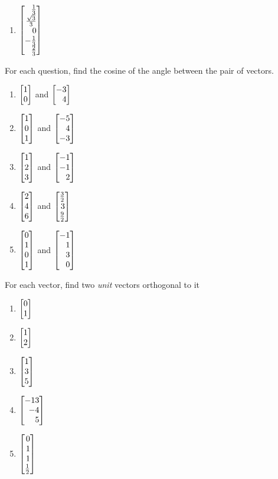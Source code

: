 \begin{exercises}
\begin{problist}
\begin{enumerate}
			\item $\mat{\frac{1}{3}\\\frac{\sqrt{3}}{3}\\0\\-\frac{1}{3}\\\frac{2}{3}}$
		\end{enumerate}
		\prob For each question, find the cosine of the angle between the pair of vectors.
		\begin{enumerate}
			\item $\mat{1\\0}$ and $\mat{-3\\4}$
			\item $\mat{1\\0\\1}$ and $\mat{-5\\4\\-3}$
			\item $\mat{1\\2\\3}$ and $\mat{-1\\-1\\2}$
			\item $\mat{2\\4\\6}$ and $\mat{\frac{3}{2}\\3\\\frac{9}{2}}$
			\item $\mat{0\\1\\0\\1}$ and $\mat{-1\\1\\3\\0}$
		\end{enumerate}
		\prob For each vector, find two \emph{unit} vectors orthogonal to it
		\begin{enumerate}
			\item $\mat{0\\1}$
			\item $\mat{1\\2}$
			\item $\mat{1\\3\\5}$
			\item $\mat{-13\\-4\\5}$
			\item $\mat{0\\1\\1\\\frac{1}{2}}$
		\end{enumerate}


\end{problist}
\end{exercises}
